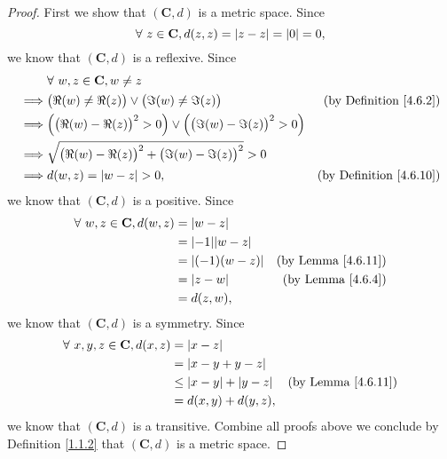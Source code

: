 \begin{proof}
    First we show that \((\mathbf{C}, d)\) is a metric space.
    Since
    \[
        \forall\ z \in \mathbf{C}, d(z, z) = \abs*{z - z} = \abs*{0} = 0,
    \]
    we know that \((\mathbf{C}, d)\) is a reflexive.
    Since
    \begin{align*}
                 & \forall\ w, z \in \mathbf{C}, w \neq z                                                                                         \\
        \implies & \big(\Re(w) \neq \Re(z)\big) \lor \big(\Im(w) \neq \Im(z)\big)                           & \text{(by Definition \ref{4.6.2})}  \\
        \implies & \Big(\big(\Re(w) - \Re(z)\big)^2 > 0\Big) \lor \Big(\big(\Im(w) - \Im(z)\big)^2 > 0\Big)                                       \\
        \implies & \sqrt{\big(\Re(w) - \Re(z)\big)^2 + \big(\Im(w) - \Im(z)\big)^2} > 0                                                           \\
        \implies & d(w, z) = \abs*{w - z} > 0,                                                              & \text{(by Definition \ref{4.6.10})}
    \end{align*}
    we know that \((\mathbf{C}, d)\) is a positive.
    Since
    \begin{align*}
        \forall\ w, z \in \mathbf{C}, d(w, z) & = \abs*{w - z}                                            \\
                                              & = \abs*{-1} \abs*{w - z}                                  \\
                                              & = \abs*{(-1) (w - z)}    & \text{(by Lemma \ref{4.6.11})} \\
                                              & = \abs*{z - w}           & \text{(by Lemma \ref{4.6.4})}  \\
                                              & = d(z, w),
    \end{align*}
    we know that \((\mathbf{C}, d)\) is a symmetry.
    Since
    \begin{align*}
        \forall\ x, y, z \in \mathbf{C}, d(x, z) & = \abs*{x - z}                                                    \\
                                                 & = \abs*{x - y + y - z}                                            \\
                                                 & \leq \abs*{x - y} + \abs*{y - z} & \text{(by Lemma \ref{4.6.11})} \\
                                                 & = d(x, y) + d(y, z),
    \end{align*}
    we know that \((\mathbf{C}, d)\) is a transitive.
    Combine all proofs above we conclude by Definition \ref{1.1.2} that \((\mathbf{C}, d)\) is a metric space.


\end{proof}

